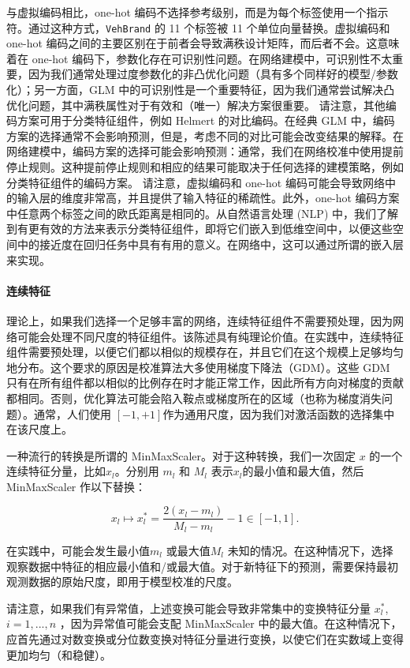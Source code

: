 \documentclass[
]{article}
\begin{document}
与虚拟编码相比，one-hot
编码不选择参考级别，而是为每个标签使用一个指示符。通过这种方式，\texttt{VehBrand}
的 11 个标签被 11 个单位向量替换。虚拟编码和 one-hot
编码之间的主要区别在于前者会导致满秩设计矩阵，而后者不会。这意味着在
one-hot
编码下，参数化存在可识别性问题。在网络建模中，可识别性不太重要，因为我们通常处理过度参数化的非凸优化问题（具有多个同样好的模型/参数化）；另一方面，GLM
中的可识别性是一个重要特征，因为我们通常尝试解决凸优化问题，其中满秩属性对于有效和（唯一）解决方案很重要。
请注意，其他编码方案可用于分类特征组件，例如 Helmert 的对比编码。在经典
GLM
中，编码方案的选择通常不会影响预测，但是，考虑不同的对比可能会改变结果的解释。在网络建模中，编码方案的选择可能会影响预测：通常，我们在网络校准中使用提前停止规则。这种提前停止规则和相应的结果可能取决于任何选择的建模策略，例如分类特征组件的编码方案。
请注意，虚拟编码和 one-hot
编码可能会导致网络中的输入层的维度非常高，并且提供了输入特征的稀疏性。此外，one-hot
编码方案中任意两个标签之间的欧氏距离是相同的。从自然语言处理 (NLP)
中，我们了解到有更有效的方法来表示分类特征组件，即将它们嵌入到低维空间中，以便这些空间中的接近度在回归任务中具有有用的意义。在网络中，这可以通过所谓的嵌入层来实现。

\paragraph{连续特征}\label{ux8fdeux7eedux7279ux5f81}

理论上，如果我们选择一个足够丰富的网络，连续特征组件不需要预处理，因为网络可能会处理不同尺度的特征组件。该陈述具有纯理论价值。在实践中，连续特征组件需要预处理，以便它们都以相似的规模存在，并且它们在这个规模上足够均匀地分布。这个要求的原因是校准算法大多使用梯度下降法（GDM）。这些
GDM
只有在所有组件都以相似的比例存在时才能正常工作，因此所有方向对梯度的贡献都相同。否则，优化算法可能会陷入鞍点或梯度所在的区域（也称为梯度消失问题）。通常，人们使用
\([-1,+1]\)作为通用尺度，因为我们对激活函数的选择集中在该尺度上。

一种流行的转换是所谓的 MinMaxScaler。对于这种转换，我们一次固定 \(x\)
的一个连续特征分量，比如\(x_l\)。分别用 \(m_l\) 和 \(M_l\)
表示\(x_l\)的最小值和最大值，然后 MinMaxScaler 作以下替换：

\[
x_l\mapsto x_l^*=\frac{2(x_l-m_l)}{M_l-m_l}-1\in[-1,1] .
\]

在实践中，可能会发生最小值\(m_l\) 或最大值\(M_l\)
未知的情况。在这种情况下，选择观察数据中特征的相应最小值和/或最大值。对于新特征下的预测，需要保持最初观测数据的原始尺度，即用于模型校准的尺度。

请注意，如果我们有异常值，上述变换可能会导致非常集中的变换特征分量
\(x_l^*\), \(i=1,...,n\) ，因为异常值可能会支配 MinMaxScaler
中的最大值。在这种情况下，应首先通过对数变换或分位数变换对特征分量进行变换，以使它们在实数域上变得更加均匀（和稳健）。
\end{document}
